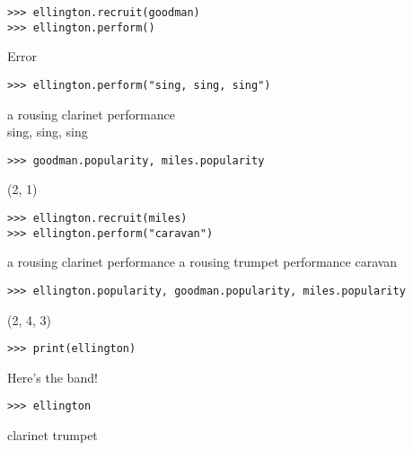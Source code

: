 \newpage
\begin{blocksection}
\begin{lstlisting}
>>> ellington.recruit(goodman)
>>> ellington.perform()
\end{lstlisting}
\begin{solution}[.2in]
Error
\end{solution}

\vspace{2\baselineskip}

\begin{lstlisting}
>>> ellington.perform("sing, sing, sing") 
\end{lstlisting}
\begin{solution}[.2in]
a rousing clarinet performance \\
sing, sing, sing
\end{solution}

\vspace{4\baselineskip}

\begin{lstlisting}
>>> goodman.popularity, miles.popularity 
\end{lstlisting}
\begin{solution}[.2in]
(2, 1)
\end{solution}

\vspace{2\baselineskip}

\begin{lstlisting}
>>> ellington.recruit(miles)
>>> ellington.perform("caravan") 
\end{lstlisting}
\begin{solution}[.2in]
a rousing clarinet performance
a rousing trumpet performance
caravan
\end{solution}

\vspace{4\baselineskip}

\begin{lstlisting}
>>> ellington.popularity, goodman.popularity, miles.popularity
\end{lstlisting}
\begin{solution}[.2in]
(2, 4, 3)
\end{solution}

\vspace{2\baselineskip}

\begin{lstlisting}
>>> print(ellington)
\end{lstlisting}
\begin{solution}[.2in]
Here's the band!
\end{solution}

\vspace{2\baselineskip}

\begin{lstlisting}
>>> ellington
\end{lstlisting}
\begin{solution}[.2in]
clarinet trumpet
\end{solution}

\end{blocksection}
